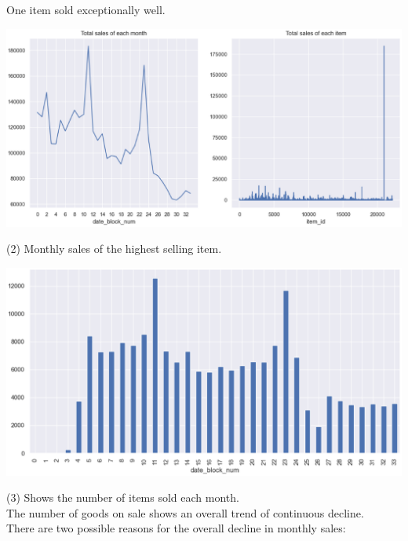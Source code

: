 One item sold exceptionally well.
\begin{center}
 
  \begin{minipage}{0.5\linewidth}
  \centering

  \includegraphics[width=1.1\textwidth]{logos/sale.eps}


  \end{minipage}
\end{center}
(2) Monthly sales of the highest selling item.
\begin{center}

  \begin{minipage}{0.5\linewidth}
  \centering

  \includegraphics[width=1.1\textwidth]{logos/highite.eps}
  

  \end{minipage}
\end{center}
(3) Shows the number of items sold each month.\\
The number of goods on sale shows an overall trend of continuous decline.\\
There are two possible reasons for the overall decline in monthly sales:\\
